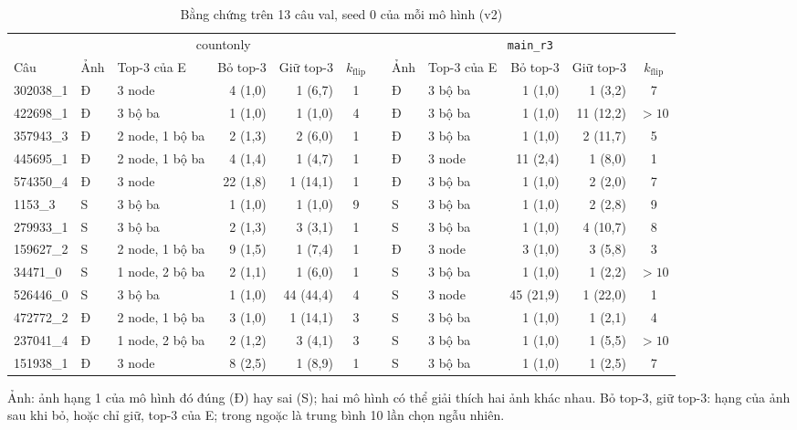 \begin{table}[t]
  \caption{Bằng chứng trên 13 câu val, seed 0 của mỗi mô hình (v2)}
  \label{tab:xai-cases}
  \centering
  \footnotesize
  \begin{tabular*}{\textwidth}{@{\extracolsep{\fill}}lllrrclllrrc@{}}
    \toprule
    & \multicolumn{5}{c}{countonly} & & \multicolumn{5}{c}{\texttt{main\_r3}} \\
    \cmidrule{2-6}\cmidrule{8-12}
    Câu & Ảnh & Top-3 của E & Bỏ top-3 & Giữ top-3 & $k_{\text{flip}}$ & & Ảnh & Top-3 của E & Bỏ top-3 & Giữ top-3 & $k_{\text{flip}}$ \\
    \midrule
    302038\_1 & Đ & 3 node & 4 (1,0) & 1 (6,7) & 1 & & Đ & 3 bộ ba & 1 (1,0) & 1 (3,2) & 7 \\
    422698\_1 & Đ & 3 bộ ba & 1 (1,0) & 1 (1,0) & 4 & & Đ & 3 bộ ba & 1 (1,0) & 11 (12,2) & $>10$ \\
    357943\_3 & Đ & 2 node, 1 bộ ba & 2 (1,3) & 2 (6,0) & 1 & & Đ & 3 bộ ba & 1 (1,0) & 2 (11,7) & 5 \\
    445695\_1 & Đ & 2 node, 1 bộ ba & 4 (1,4) & 1 (4,7) & 1 & & Đ & 3 node & 11 (2,4) & 1 (8,0) & 1 \\
    574350\_4 & Đ & 3 node & 22 (1,8) & 1 (14,1) & 1 & & Đ & 3 bộ ba & 1 (1,0) & 2 (2,0) & 7 \\
    1153\_3 & S & 3 bộ ba & 1 (1,0) & 1 (1,0) & 9 & & S & 3 bộ ba & 1 (1,0) & 2 (2,8) & 9 \\
    279933\_1 & S & 3 bộ ba & 2 (1,3) & 3 (3,1) & 1 & & S & 3 bộ ba & 1 (1,0) & 4 (10,7) & 8 \\
    159627\_2 & S & 2 node, 1 bộ ba & 9 (1,5) & 1 (7,4) & 1 & & Đ & 3 node & 3 (1,0) & 3 (5,8) & 3 \\
    34471\_0 & S & 1 node, 2 bộ ba & 2 (1,1) & 1 (6,0) & 1 & & S & 3 bộ ba & 1 (1,0) & 1 (2,2) & $>10$ \\
    526446\_0 & S & 3 bộ ba & 1 (1,0) & 44 (44,4) & 4 & & S & 3 node & 45 (21,9) & 1 (22,0) & 1 \\
    472772\_2 & Đ & 2 node, 1 bộ ba & 3 (1,0) & 1 (14,1) & 3 & & S & 3 bộ ba & 1 (1,0) & 1 (2,1) & 4 \\
    237041\_4 & Đ & 1 node, 2 bộ ba & 2 (1,2) & 3 (4,1) & 3 & & S & 3 bộ ba & 1 (1,0) & 1 (5,5) & $>10$ \\
    151938\_1 & Đ & 3 node & 8 (2,5) & 1 (8,9) & 1 & & S & 3 bộ ba & 1 (1,0) & 1 (2,5) & 7 \\
    \bottomrule
  \end{tabular*}
  \par\smallskip
  {\scriptsize\raggedright
    Ảnh: ảnh hạng 1 của mô hình đó đúng (Đ) hay sai (S); hai mô hình có thể giải thích hai ảnh khác nhau.
    Bỏ top-3, giữ top-3: hạng của ảnh sau khi bỏ, hoặc chỉ giữ, top-3 của E; trong ngoặc là trung bình 10 lần chọn ngẫu nhiên.\par}
\end{table}

